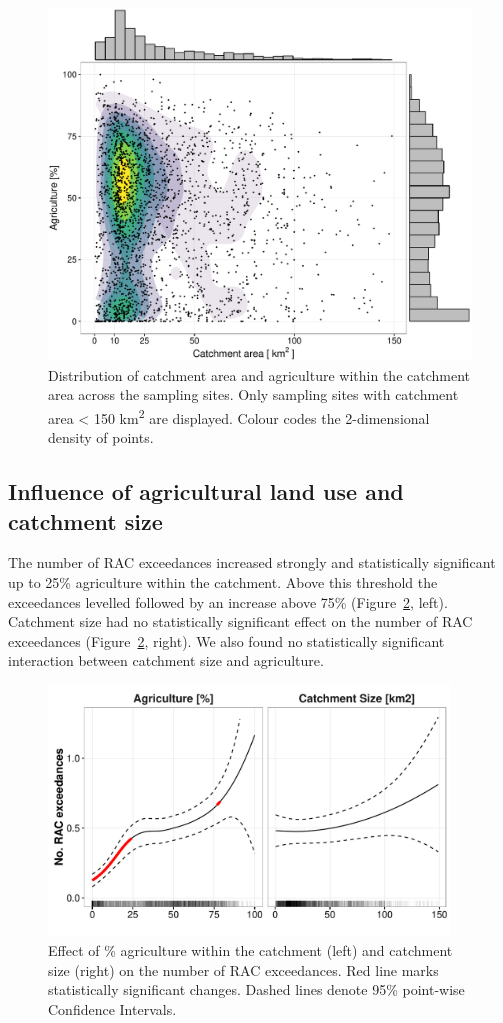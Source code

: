 \documentclass[journal=esthag,manuscript=article]{achemso}
\begin{document}
\begin{figure}[ht]
  \includegraphics[width=.8\textwidth]{figure3.pdf}
  \caption{Distribution of catchment area and agriculture within the catchment area across the sampling sites.
  Only sampling sites with catchment area < 150 km\textsuperscript{2} are displayed. 
  Colour codes the 2-dimensional density of points.}
  \label{fig:fig3}
\end{figure}


\subsection{Influence of agricultural land use and catchment size}
The number of RAC exceedances increased strongly and statistically significant up to 25\% agriculture within the catchment.
Above this threshold the exceedances levelled followed by an increase above 75\% (Figure~\ref{fig:fig4}, left).
Catchment size had no statistically significant effect on the number of RAC exceedances (Figure~\ref{fig:fig4}, right).
We also found no statistically significant interaction between catchment size and agriculture.

\begin{figure}[ht]
  \includegraphics[width=0.95\textwidth]{figure4.pdf}
  \caption{Effect of \% agriculture within the catchment (left) and catchment size (right) on the number of RAC exceedances. Red line marks statistically significant changes. Dashed lines denote 95\% point-wise Confidence Intervals.
  }
  \label{fig:fig4}
\end{figure}
\end{document}
